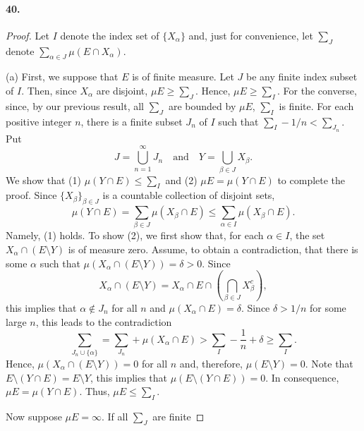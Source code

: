   \paragraph{40.}
  \begin{proof}
    Let $I$ denote the index set of $\{X_\alpha\}$ and, just for convenience,
    let $\sum_J$ denote $\sum_{\alpha\in J}\mu(E\cap X_\alpha)$.\par
    (a) First, we suppose that $E$ is of finite measure. Let $J$ be any finite
    index subset of $I$. Then, since $X_\alpha$ are disjoint, $\mu E\ge\sum_J$. 
    Hence, $\mu E\ge\sum_I$. For the converse, since, by our previous result, 
    all $\sum_J$ are bounded by $\mu E$, $\sum_I$ is finite. For each positive
    integer $n$, there is a finite subset $J_n$ of $I$ such that $\sum_I-1/n<
    \sum_{J_n}$. Put
    \[
      J=\bigcup_{n=1}^\infty J_n
      \quad\text{and}\quad
      Y=\bigcup_{\beta\in J}X_\beta.
    \]
    We show that (1) $\mu(Y\cap E)\le\sum_I$ and (2) $\mu E=\mu(Y\cap E)$ to
    complete the proof. Since $\{X_\beta\}_{\beta\in J}$ is a countable 
    collection of disjoint sets,
    \[
      \mu(Y\cap E)=\sum_{\beta\in J}\mu(X_\beta\cap E)\le
      \sum_{\alpha\in I}\mu(X_\beta\cap E).
    \]
    Namely, (1) holds. To show (2), we first show that, for each $\alpha\in I$, 
    the set $X_\alpha\cap(E\setminus Y)$ is of measure zero. Assume, to obtain
    a contradiction, that there is some $\alpha$ such that $\mu(X_\alpha\cap(
    E\setminus Y))=\delta>0$. Since
    \[
      X_\alpha\cap(E\setminus Y)=
      X_\alpha\cap E\cap\left(\bigcap_{\beta\in J}X_\beta^c\right),
    \]
    this implies that $\alpha\notin J_n$ for all $n$ and $\mu(X_\alpha\cap E)=
    \delta$. Since $\delta>1/n$ for some large $n$, this leads to the 
    contradiction
    \[
      \sum_{J_n\cup\{\alpha\}}=\sum_{J_n}+\mu(X_\alpha\cap E)
      >\sum_I-\frac{1}{n}+\delta\ge\sum_I.
    \]
    Hence, $\mu(X_\alpha\cap(E\setminus Y))=0$ for all $n$ and, therefore, 
    $\mu(E\setminus Y)=0$. Note that $E\setminus(Y\cap E)=E\setminus Y$, this
    implies that $\mu(E\setminus(Y\cap E))=0$. In consequence, $\mu E=\mu(Y\cap
    E)$. Thus, $\mu E\le\sum_I$.\par
    Now suppose $\mu E=\infty$. If all $\sum_J$ are finite
  \end{proof}
  
